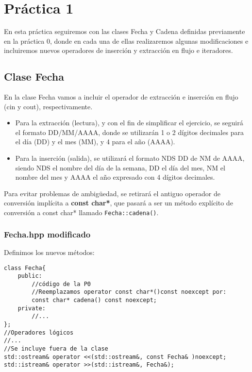 \chapter{Práctica 1}

En esta práctica seguiremos con las clases Fecha y Cadena definidas previamente en la práctica 0,
 donde en cada una de ellas realizaremos algunas modificaciones e incluiremos nuevos operadores 
 de inserción y extracción en flujo e iteradores.

\section{Clase Fecha}
En la clase Fecha vamos a incluir el operador de extracción e inserción en flujo (cin y cout),
respectivamente.
\begin{itemize}
    \item \textbf{} Para la extracción (lectura), y 
    con el fin de simplificar el ejercicio, se seguirá el formato DD/MM/AAAA, donde 
    se utilizarán 1 o 2 dígitos decimales para el día (DD) y el mes (MM), y 4 para el año (AAAA).
    
    \item \textbf{} Para la inserción (salida), se utilizará el formato 
    NDS DD de NM de AAAA, siendo NDS el nombre del día de la semana, DD el día del mes, 
    NM el nombre del mes y AAAA el año expresado con 4 dígitos decimales.
\end{itemize}

Para evitar problemas de ambigüedad, se retirará el antiguo operador de conversión implícita a 
\textbf{const char*}, que pasará a ser un método explícito de conversión a const char* llamado 
\texttt{Fecha::cadena()}.
\subsection{Fecha.hpp modificado}
Definimos los nuevos métodos:
\begin{verbatim}
class Fecha{
    public:
        //código de la P0
        //Reemplazamos operator const char*()const noexcept por:
        const char* cadena() const noexcept;
    private:
        //...
};
//Operadores lógicos
//...
//Se incluye fuera de la clase
std::ostream& operator <<(std::ostream&, const Fecha& )noexcept;
std::istream& operator >>(std::istream&, Fecha&);
\end{verbatim}
\newpage
